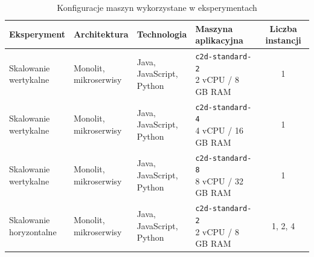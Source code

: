 \begin{table}[H]
    \centering
    \caption{Konfiguracje maszyn wykorzystane w eksperymentach}
    \label{tab:machine-configurations}
    \small
    \renewcommand{\arraystretch}{1.25}
    \begin{tabular}{|l|l|l|l|c|}
        \hline
        \textbf{Eksperyment} &
        \textbf{Architektura} &
        \textbf{Technologia} &
        \textbf{Maszyna aplikacyjna} &
        \textbf{Liczba instancji} \\ \hline

        \makecell[l]{Skalowanie\\wertykalne} &
        \makecell[l]{Monolit,\\mikroserwisy} &
        \makecell[l]{Java,\\JavaScript,\\Python} &
        \makecell[l]{\texttt{c2d-standard-2}\\2 vCPU / 8 GB RAM} &
        1 \\ \hline

        \makecell[l]{Skalowanie\\wertykalne} &
        \makecell[l]{Monolit,\\mikroserwisy} &
        \makecell[l]{Java,\\JavaScript,\\Python} &
        \makecell[l]{\texttt{c2d-standard-4}\\4 vCPU / 16 GB RAM} &
        1 \\ \hline

        \makecell[l]{Skalowanie\\wertykalne} &
        \makecell[l]{Monolit,\\mikroserwisy} &
        \makecell[l]{Java,\\JavaScript,\\Python} &
        \makecell[l]{\texttt{c2d-standard-8}\\8 vCPU / 32 GB RAM} &
        1 \\ \hline

        \makecell[l]{Skalowanie\\horyzontalne} &
        \makecell[l]{Monolit,\\mikroserwisy} &
        \makecell[l]{Java,\\JavaScript,\\Python} &
        \makecell[l]{\texttt{c2d-standard-2}\\2 vCPU / 8 GB RAM} &
        1, 2, 4 \\ \hline
    \end{tabular}
\end{table}


